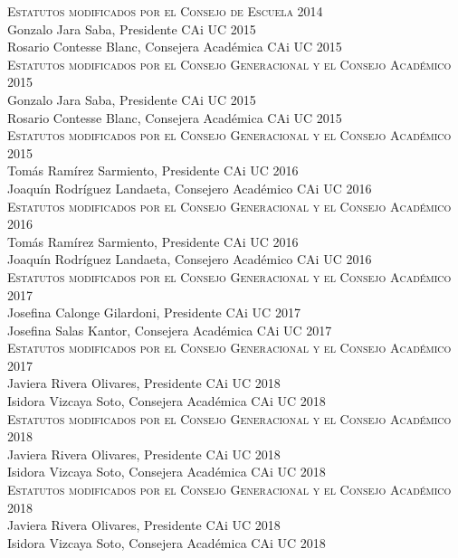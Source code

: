 \documentclass[letterpaper,11pt]{article}
\theoremstyle{definition}%
\begin{document}
\begin{sloppypar}
	\textsc{Estatutos modificados por el Consejo de Escuela 2014}\\
	Gonzalo Jara Saba, Presidente CAi UC 2015\\
	Rosario Contesse Blanc, Consejera Académica CAi UC 2015\\

	\textsc{Estatutos modificados por el Consejo Generacional y el Consejo Académico 2015}\\
	Gonzalo Jara Saba, Presidente CAi UC 2015\\
	Rosario Contesse Blanc, Consejera Académica CAi UC 2015\\

	\textsc{Estatutos modificados por el Consejo Generacional y el Consejo Académico 2015}\\
	Tomás Ramírez Sarmiento, Presidente CAi UC 2016\\
	Joaquín Rodríguez Landaeta, Consejero Académico CAi UC 2016\\

	\textsc{Estatutos modificados por el Consejo Generacional y el Consejo Académico 2016}\\
	Tomás Ramírez Sarmiento, Presidente CAi UC 2016\\
	Joaquín Rodríguez Landaeta, Consejero Académico CAi UC 2016\\

	\textsc{Estatutos modificados por el Consejo Generacional y el Consejo Académico 2017}\\
	Josefina Calonge Gilardoni, Presidente CAi UC 2017\\
	Josefina Salas Kantor, Consejera Académica CAi UC 2017\\

	\textsc{Estatutos modificados por el Consejo Generacional y el Consejo Académico 2017}\\
	Javiera Rivera Olivares, Presidente CAi UC 2018\\
	Isidora Vizcaya Soto, Consejera Académica CAi UC 2018\\

	\textsc{Estatutos modificados por el Consejo Generacional y el Consejo Académico 2018}\\
	Javiera Rivera Olivares, Presidente CAi UC 2018\\
	Isidora Vizcaya Soto, Consejera Académica CAi UC 2018\\

	\textsc{Estatutos modificados por el Consejo Generacional y el Consejo Académico 2018}\\
	Javiera Rivera Olivares, Presidente CAi UC 2018\\
	Isidora Vizcaya Soto, Consejera Académica CAi UC 2018\\


\end{sloppypar}
\end{document}
